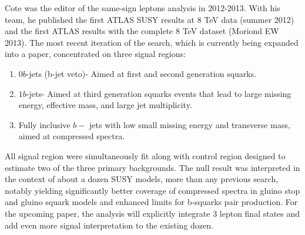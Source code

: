 Cote was the editor of the same-sign leptons analysis in
2012-2013. With his team, he published the first ATLAS SUSY
results at 8 TeV data (summer 2012) and the first ATLAS results with
the complete 8 TeV dataset (Moriond EW 2013). The most recent
iteration of the search, which is currently being expanded into a paper,
concentrated on  three signal regions:
\begin{enumerate}
\item $0 b$-jets (b-jet veto)- Aimed at first and second generation
  squarks.
\item $1 b$-jets- Aimed at third generation squarks events that lead to large
  missing energy, effective mass, and large jet multiplicity.
\item Fully inclusive $b-$ jets with low small missing energy and
  transverse mass, aimed at compressed spectra. 
\end{enumerate}
All signal region were simultaneously fit along with control region
designed to estimate two of the three primary backgrounds. The null
result was interpreted in the context of about a dozen SUSY models,
more than any previous search, notably yielding significantly better
coverage of compressed spectra in gluino stop and gluino squark models
and enhanced limits for b-squarks pair production. For the upcoming
paper, the analysis will explicitly integrate 3 lepton final states
and add even more signal interpretation to the existing dozen.






